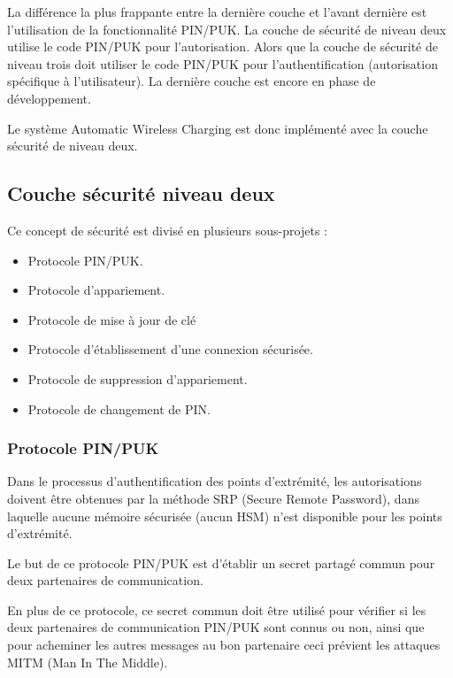 La différence la plus frappante entre la dernière couche et l'avant dernière est l'utilisation de la fonctionnalité PIN/PUK. La couche de sécurité de niveau deux utilise le code PIN/PUK pour l'autorisation. Alors que la couche de sécurité de niveau trois doit utiliser le code PIN/PUK pour l'authentification (autorisation spécifique à l'utilisateur). La dernière couche est encore en phase de développement.

Le système Automatic Wireless Charging est donc implémenté avec la couche sécurité de niveau deux.

\subsection{Couche sécurité niveau deux}

Ce concept de sécurité est divisé en plusieurs sous-projets : 

\begin{itemize}

	\item Protocole PIN/PUK.
	\item Protocole d'appariement.
	\item Protocole de mise à jour de clé
	\item Protocole d'établissement d'une connexion sécurisée.
	\item Protocole de suppression d'appariement.
	\item Protocole de changement de PIN.

\end{itemize}

\subsubsection{Protocole PIN/PUK}

Dans le processus d'authentification des points d'extrémité, les autorisations doivent être obtenues par la méthode SRP (Secure Remote Password), dans laquelle aucune mémoire sécurisée (aucun HSM) n'est disponible pour les points d'extrémité.

Le but de ce protocole PIN/PUK est d'établir un secret partagé commun pour deux partenaires de communication.

En plus de ce protocole, ce secret commun doit être utilisé pour vérifier si les deux partenaires de communication PIN/PUK sont connus ou non, ainsi que pour acheminer les autres messages au bon partenaire ceci prévient les attaques MITM (Man In The Middle).

